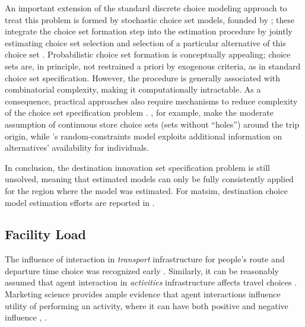 An important extension of the standard discrete choice modeling approach to treat this problem is formed by stochastic choice set models, founded by \citet[][]{Manski_TD_1977, BurnettKPHanson_TRR_1979, BurnettKP_UG_1980}; these integrate the choice set formation step into the estimation procedure by jointly estimating  choice set selection and selection of a particular alternative of this choice set \citep[][]{Manski_TD_1977, BenAkivaBoccara_IJRM_1995}.
%
Probabilistic choice set formation is conceptually appealing; choice sets are, in principle, not restrained a priori by exogenous criteria, as in standard choice set specification. 
However, the procedure is generally associated with combinatorial complexity, making it computationally intractable. 
As a consequence, practical approaches also require mechanisms to reduce complexity of the choice set specification problem \citep[e.g.,][p.11]{BenAkivaBoccara_IJRM_1995}. 
\citet[][]{ZhengJieGuo_TRB_2008}, for example, make the moderate assumption of continuous store choice sets (\ie sets without ``holes'') around the trip origin, while \citet[][]{BenAkivaBoccara_IJRM_1995}'s random-constraints model exploits additional information on alternatives' availability for individuals.

In conclusion, the destination innovation set specification problem is still unsolved, meaning that estimated models can only be fully consistently applied for the region where the model was estimated. 
For \gls{matsim}, 
destination choice model estimation efforts are reported in \citet[][Chapter 5]{Horni_PhDThesis_2013}.

\subsection{Facility Load}
\label{sec:facilityload}
The influence of interaction in \emph{transport} infrastructure for people's route and departure time choice was recognized early \citep[e.g.,][]{Pigou_1920, Knight_QJE_1924, Wardrop_PICE_1952}. 
Similarly, it can be reasonably assumed that agent interaction in \emph{activities} infrastructure affects travel choices \citep[][]{Axhausen_SSRL_2006}. 
Marketing science provides ample evidence that agent interactions influence utility of performing an activity, where it can have both positive and negative influence \citep[][p.331]{BakerJEtAl_JAMS_1994}, \citep[][]{ErogluAndHarrell_JR_1986, ErogluAndMachleit_JR_1990, ErogluEtAl_JBR_2005, HarrellEtAl_JMR_1980, HuiAndBateson_JCR_1991, PonsEtAl_PsychMark_2006}.

